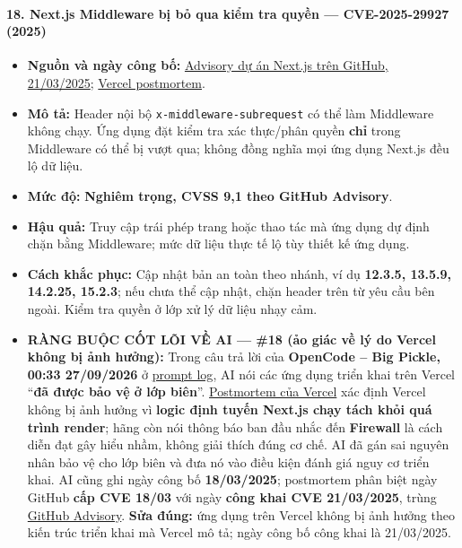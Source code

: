 \paragraph{18. Next.js Middleware bị bỏ qua kiểm tra quyền --- CVE-2025-29927 (2025)}\label{next.js-middleware-bux1ecb-bux1ecf-qua-kiux1ec3m-tra-quyux1ec1n-cve-2025-29927-2025}

\begin{itemize}
\tightlist
\item
  \textbf{Nguồn và ngày công bố:} \href{https://github.com/vercel/next.js/security/advisories/GHSA-f82v-jwr5-mffw}{Advisory dự án Next.js trên GitHub, 21/03/2025}; \href{https://vercel.com/blog/postmortem-on-next-js-middleware-bypass}{Vercel postmortem}.
\item
  \textbf{Mô tả:} Header nội bộ \texttt{x-middleware-subrequest} có thể làm Middleware không chạy. Ứng dụng đặt kiểm tra xác thực/phân quyền \textbf{chỉ} trong Middleware có thể bị vượt qua; không đồng nghĩa mọi ứng dụng Next.js đều lộ dữ liệu.
\item
  \textbf{Mức độ:} \textbf{Nghiêm trọng, CVSS 9,1 theo GitHub Advisory}.
\item
  \textbf{Hậu quả:} Truy cập trái phép trang hoặc thao tác mà ứng dụng dự định chặn bằng Middleware; mức dữ liệu thực tế lộ tùy thiết kế ứng dụng.
\item
  \textbf{Cách khắc phục:} Cập nhật bản an toàn theo nhánh, ví dụ \textbf{12.3.5, 13.5.9, 14.2.25, 15.2.3}; nếu chưa thể cập nhật, chặn header trên từ yêu cầu bên ngoài. Kiểm tra quyền ở lớp xử lý dữ liệu nhạy cảm.
\item
  \textbf{RÀNG BUỘC CỐT LÕI VỀ AI --- \#18 (ảo giác về lý do Vercel không bị ảnh hưởng):} Trong câu trả lời của \textbf{OpenCode -- Big Pickle, 00:33 27/09/2026} ở \href{Appendix_A_Prompt_Log.md}{prompt log}, AI nói các ứng dụng triển khai trên Vercel ``\textbf{đã được bảo vệ ở lớp biên}''. \href{https://vercel.com/blog/postmortem-on-next-js-middleware-bypass}{Postmortem của Vercel} xác định Vercel không bị ảnh hưởng vì \textbf{logic định tuyến Next.js chạy tách khỏi quá trình render}; hãng còn nói thông báo ban đầu nhắc đến \textbf{Firewall} là cách diễn đạt gây hiểu nhầm, không giải thích đúng cơ chế. AI đã gán sai nguyên nhân bảo vệ cho lớp biên và đưa nó vào điều kiện đánh giá nguy cơ triển khai. AI cũng ghi ngày công bố \textbf{18/03/2025}; postmortem phân biệt ngày GitHub \textbf{cấp CVE 18/03} với ngày \textbf{công khai CVE 21/03/2025}, trùng \href{https://github.com/vercel/next.js/security/advisories/GHSA-f82v-jwr5-mffw}{GitHub Advisory}. \textbf{Sửa đúng:} ứng dụng trên Vercel không bị ảnh hưởng theo kiến trúc triển khai mà Vercel mô tả; ngày công bố công khai là 21/03/2025.
\end{itemize}

